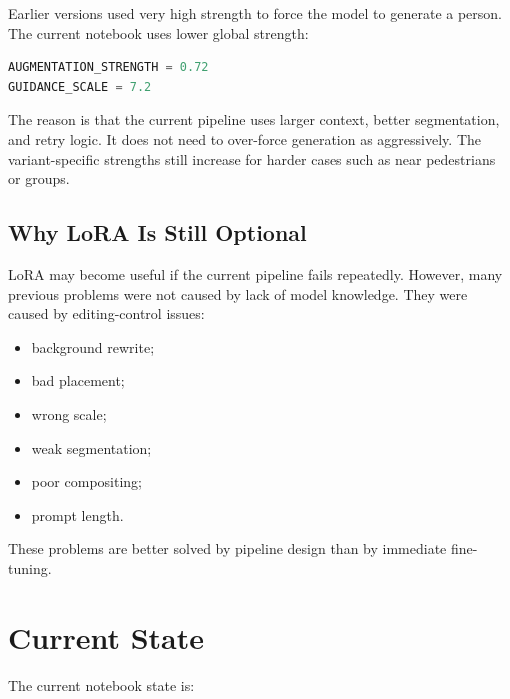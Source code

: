 \documentclass[12pt,a4paper]{article}
\begin{document}
Earlier versions used very high strength to force the model to generate a
person. The current notebook uses lower global strength:

\begin{lstlisting}[language=Python]
AUGMENTATION_STRENGTH = 0.72
GUIDANCE_SCALE = 7.2
\end{lstlisting}

The reason is that the current pipeline uses larger context, better segmentation,
and retry logic. It does not need to over-force generation as aggressively. The
variant-specific strengths still increase for harder cases such as near
pedestrians or groups.

\subsection{Why LoRA Is Still Optional}

LoRA may become useful if the current pipeline fails repeatedly. However, many
previous problems were not caused by lack of model knowledge. They were caused
by editing-control issues:

\begin{itemize}
    \item background rewrite;
    \item bad placement;
    \item wrong scale;
    \item weak segmentation;
    \item poor compositing;
    \item prompt length.
\end{itemize}

These problems are better solved by pipeline design than by immediate
fine-tuning.

\section{Current State}

The current notebook state is:
\end{document}
